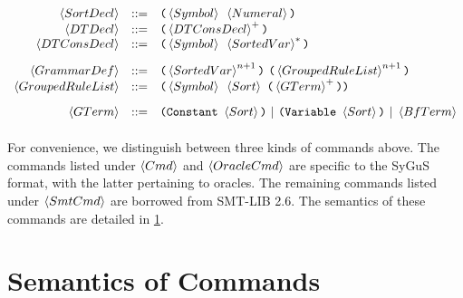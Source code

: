 \documentclass[english,a4paper,10pt]{article}
\begin{document}
\[
\begin{array}{rcl}  
 \sortdecl& ::= & \paren{\symbol\mbox{ }\intconst}\\
 \dtdecl & ::= & \paren{\kplus{\dtconsdecl}} \\
 \dtconsdecl & ::= & \paren{\symbol\mbox{ }\kstar{\sortedvar}} \\[2ex]
 \grammardef & ::= & \paren{\kstarn{\sortedvar}{n+1}}\mbox{ }\paren{\kstarn{\ntdef}{n+1}} \\
 \ntdef & ::= & \paren{\symbol\mbox{ }\sortexpr\mbox{ }\paren{ \kplus{\gterm} } } \\[2ex]
 \gterm 
 & ::= &  \paren{\constantkwd\mbox{ }\sortexpr}\mbox{ }|\mbox{ }\paren{\varkwd\mbox{ }\sortexpr}\mbox{ }|\mbox{ }\bfterm \\[2ex]
\end{array}
\]
For convenience,
we distinguish between three kinds of commands above.
The commands listed under $\cmd$ and $\oraclecmd$ are specific to the SyGuS format,
with the latter pertaining to oracles.
The remaining commands listed under $\smtcmd$
are borrowed from SMT-LIB 2.6.
The semantics of these commands are detailed in \cref{sec:semantics}.


\section{Semantics of Commands}%
\label{sec:semantics}
\end{document}
